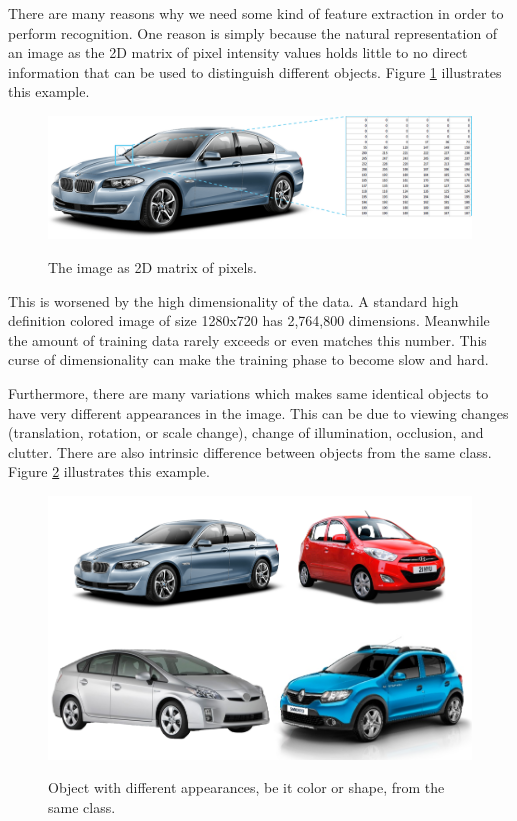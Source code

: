\documentclass[a4paper,11pt]{kth-mag}
\begin{document}
There are many reasons why we need some kind of feature extraction in order to perform recognition. One reason is simply because the natural representation of an image as the 2D matrix of pixel intensity values holds little to no direct information that can be used to distinguish different objects. Figure \ref{fig:car} illustrates this example. 

\begin{figure}[h]
\centering
\includegraphics[scale=0.4]{image/car.png}
\label{fig:car}
\caption{The image as 2D matrix of pixels.}
\end{figure}

This is worsened by the high dimensionality of the data. A standard high definition colored image of size 1280x720 has 2,764,800 dimensions. Meanwhile the amount of training data rarely exceeds or even matches this number. This curse of dimensionality can make the training phase to become slow and hard.

Furthermore, there are many variations which makes same identical objects to have very different appearances in the image. This can be due to viewing changes (translation, rotation, or scale change), change of illumination, occlusion, and clutter. There are also intrinsic difference between objects from the same class. Figure \ref{fig:cars} illustrates this example.

\begin{figure}[h]
\centering
\includegraphics[scale=0.4]{image/cars.png}
\label{fig:cars}
\caption{Object with different appearances, be it color or shape, from the same class.}
\end{figure}
\end{document}
